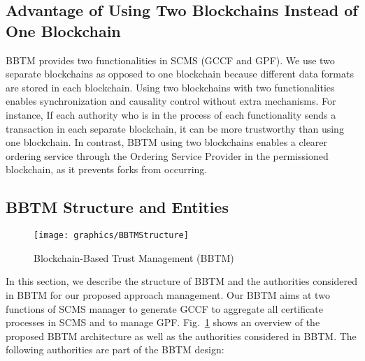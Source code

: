 
\subsection{Advantage of Using Two Blockchains Instead of One Blockchain}
BBTM provides two functionalities in SCMS (GCCF and GPF). We use two separate blockchains as opposed to one blockchain because different data formats are stored in each blockchain. Using two blockchains with two functionalities enables synchronization and causality control without extra mechanisms. For instance, If each authority who is in the process of each functionality sends a transaction in each separate blockchain, it can be more trustworthy than using one blockchain. In contrast, BBTM using two blockchains enables a clearer ordering service through the Ordering Service Provider in the permissioned blockchain, as it prevents forks from occurring.




\subsection{BBTM Structure and Entities}

\begin{figure}[t]
\centering
{\texttt{[image: graphics/BBTMStructure]}}
\caption{Blockchain-Based Trust Management (BBTM) %
}
\label{fig:BbTM}
\end{figure}

In this section, we describe the structure of BBTM and the authorities considered in BBTM for our proposed approach management. Our BBTM aims at two functions of SCMS manager to generate GCCF to aggregate all certificate processes in SCMS and to manage GPF. Fig.~\ref{fig:BbTM} shows an overview of the proposed BBTM architecture as well as the authorities considered in BBTM. The following authorities are part of the BBTM design: 

